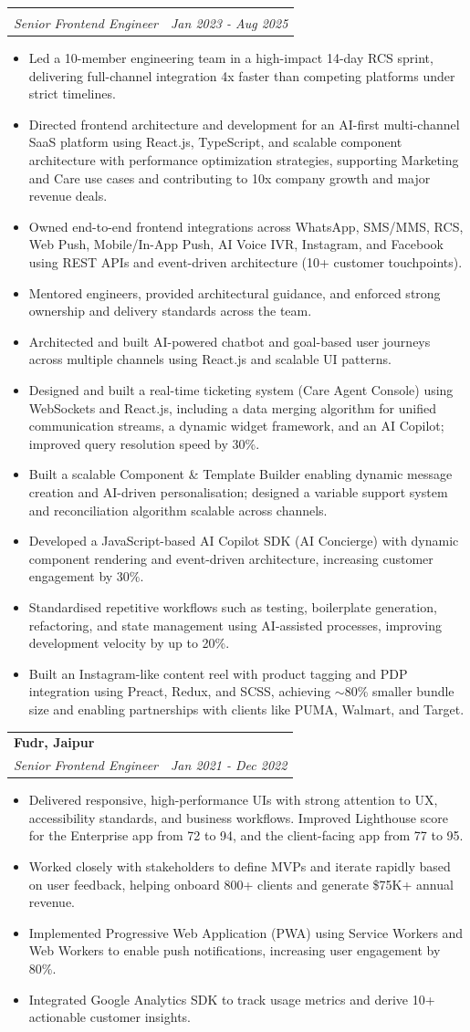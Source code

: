 \documentclass[letterpaper,11pt]{article}
\makeatletter
\newcommand{\resumeItem}[1]{\item \small{#1}}
\newcommand{\resumeSubheading}[4]{
  \vspace{-2pt}\item
  \begin{tabular*}{0.97\textwidth}[t]{l@{\extracolsep{\fill}}r}
    \textbf{#1} & #2 \\
    \textit{\small#3} & \textit{\small #4} \\
  \end{tabular*}\vspace{-6pt}
}
\newcommand{\resumeItemListStart}{\begin{itemize}[leftmargin=0.2in, label=\textbullet]}
\newcommand{\resumeItemListEnd}{\end{itemize}\vspace{-5pt}}
\makeatother
\begin{document}
\resumeSubheading
{}{ }{Senior Frontend Engineer}{Jan 2023 - Aug 2025}
\resumeItemListStart
\resumeItem{Led a 10-member engineering team in a high-impact 14-day RCS sprint, delivering full-channel integration 4x faster than competing platforms under strict timelines.}
\resumeItem{Directed frontend architecture and development for an AI-first multi-channel SaaS platform using React.js, TypeScript, and scalable component architecture with performance optimization strategies, supporting Marketing and Care use cases and contributing to 10x company growth and major revenue deals.}
\resumeItem{Owned end-to-end frontend integrations across WhatsApp, SMS/MMS, RCS, Web Push, Mobile/In-App Push, AI Voice IVR, Instagram, and Facebook using REST APIs and event-driven architecture (10+ customer touchpoints).}
\resumeItem{Mentored engineers, provided architectural guidance, and enforced strong ownership and delivery standards across the team.}
\resumeItem{Architected and built AI-powered chatbot and goal-based user journeys across multiple channels using React.js and scalable UI patterns.}
\resumeItem{Designed and built a real-time ticketing system (Care Agent Console) using WebSockets and React.js, including a data merging algorithm for unified communication streams, a dynamic widget framework, and an AI Copilot; improved query resolution speed by 30\%.}
\resumeItem{Built a scalable Component \& Template Builder enabling dynamic message creation and AI-driven personalisation; designed a variable support system and reconciliation algorithm scalable across channels.}
\resumeItem{Developed a JavaScript-based AI Copilot SDK (AI Concierge) with dynamic component rendering and event-driven architecture, increasing customer engagement by 30\%.}
\resumeItem{Standardised repetitive workflows such as testing, boilerplate generation, refactoring, and state management using AI-assisted processes, improving development velocity by up to 20\%.}
\resumeItem{Built an Instagram-like content reel with product tagging and PDP integration using Preact, Redux, and SCSS, achieving $\sim$80\% smaller bundle size and enabling partnerships with clients like PUMA, Walmart, and Target.}
\resumeItemListEnd

\resumeSubheading
{Fudr, Jaipur}{}{Senior Frontend Engineer}{Jan 2021 - Dec 2022}
\resumeItemListStart
\resumeItem{Delivered responsive, high-performance UIs with strong attention to UX, accessibility standards, and business workflows. Improved Lighthouse score for the Enterprise app from 72 to 94, and the client-facing app from 77 to 95.}
\resumeItem{Worked closely with stakeholders to define MVPs and iterate rapidly based on user feedback, helping onboard 800+ clients and generate \$75K+ annual revenue.}
\resumeItem{Implemented Progressive Web Application (PWA) using Service Workers and Web Workers to enable push notifications, increasing user engagement by 80\%.}
\resumeItem{Integrated Google Analytics SDK to track usage metrics and derive 10+ actionable customer insights.}
\resumeItemListEnd
\end{document}
